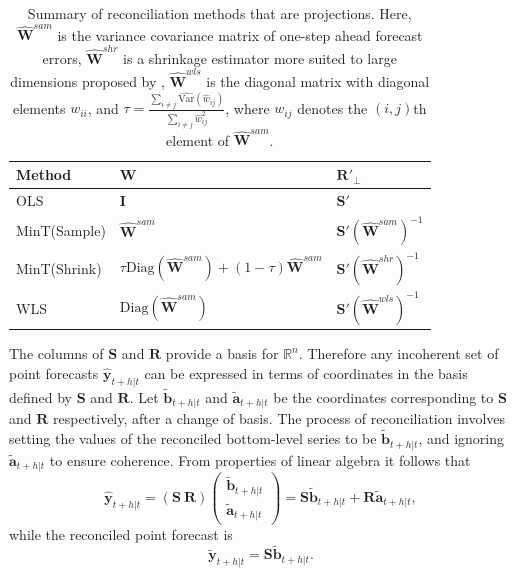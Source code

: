 \documentclass[12pt]{article}
\def\var{\text{Var}}
\theoremstyle{definition}
\begin{document}
\begin{table}[!h]
	\caption{Summary of reconciliation methods that are projections. Here, $\hat{\bm{W}}^{sam}$ is the variance covariance matrix of one-step ahead forecast errors, $\hat{\bm{W}}^{shr}$ is a shrinkage estimator more suited to large dimensions proposed by \citet{Schafer2005}, $\hat{\bm{W}}^{wls}$ is the diagonal matrix with diagonal elements $w_{ii}$, and $\tau = \frac{\sum_{i \neq j}\hat{\var}(\hat{w}_{ij})}{\sum_{i \neq j}{\hat{w}}^2_{ij}}$, where $w_{ij}$ denotes the $(i,j)$th element of $\hat{\bm{W}}^{sam}$.}\label{table:ReconMethods}
	\centering
	\begin{tabular}{lll}
		\toprule
		\textbf{Method} & \textbf{$\bm{W}$} & \textbf{ $\bm{R}'_\bot$}      \\
		\midrule
		OLS             &
		$\bm{I}$  &
		$\bm{S}'$  \\
		MinT(Sample)    &
		$\hat{\bm{W}}^{sam}$ &
		$\bm{S}'(\hat{\bm{W}}^{sam})^{-1}$ \\
		MinT(Shrink)    &
		$\tau\text{Diag}(\hat{\bm{W}}^{sam}) + (1-\tau)\hat{\bm{W}}^{sam}$ &
		$\bm{S}'(\hat{\bm{W}}^{shr})^{-1}$ \\
		WLS       &
		$\text{Diag}(\hat{\bm{W}}^{sam})$ &
		$\bm{S}'(\hat{\bm{W}}^{wls})^{-1}$ \\
		\bottomrule
	\end{tabular}
\end{table}

The columns of $\bm{S}$ and $\bm{R}$ provide a basis for $\mathbb{R}^n$. Therefore any incoherent set of point forecasts $\hat{\bm{y}}_{t+h|t}$ can be expressed in terms of coordinates in the basis defined by $\bm{S}$ and $\bm{R}$. Let $\tilde{\bm{b}}_{t+h|t}$ and $\tilde{\bm{a}}_{t+h|t}$ be the coordinates corresponding to $\bm{S}$ and $\bm{R}$ respectively, after a change of basis. The process of reconciliation involves setting the values of the reconciled bottom-level series to be $\tilde{\bm{b}}_{t+h|t}$, and ignoring $\tilde{\bm{a}}_{t+h|t}$ to ensure coherence. From properties of linear algebra it follows that
\[
  \hat{\bm{y}}_{t+h|t} = (\bm{S} ~ \bm{R})
  \begin{pmatrix}
  \tilde{\bm{b}}_{t+h|t}\\ \tilde{\bm{a}}_{t+h|t}
  \end{pmatrix}= \bm{S}\tilde{\bm{b}}_{t+h|t} + \bm{R}\tilde{\bm{a}}_{t+h|t},
\]
while the reconciled point forecast is
\[
  \tilde{\bm{y}}_{t+h|t} = \bm{S}\tilde{\bm{b}}_{t+h|t}.
\]
\end{document}
